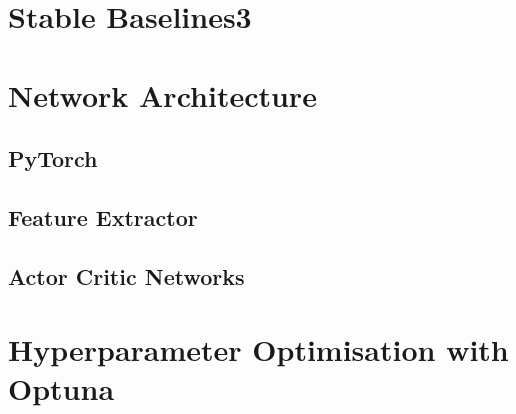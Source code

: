 \section{Stable Baselines3}


\section{Network Architecture}

\subsection{PyTorch}

\subsection{Feature Extractor}

\subsection{Actor Critic Networks}


\section{Hyperparameter Optimisation with Optuna}
